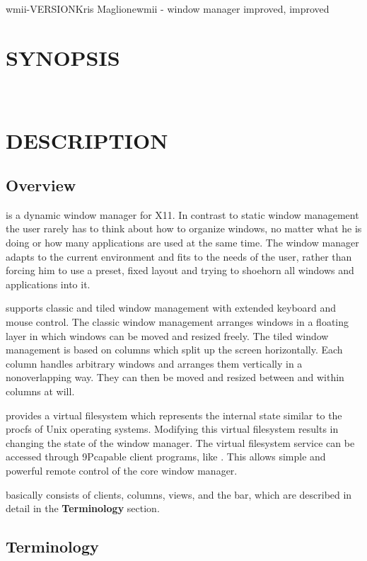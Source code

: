 \begin{Name}{1}{wmii-VERSION}{Kris Maglione}{}{wmii - window manager improved, improved}
\section{SYNOPSIS}
   \\
 

\section{DESCRIPTION}

\subsection{Overview}

 is a dynamic window manager for X11. In contrast to
static window management the user rarely has to think about how to
organize windows, no matter what he is doing or how many
applications are used at the same time.  The window manager adapts
to the current environment and fits to the needs of the user, rather
than forcing him to use a preset, fixed layout and trying to
shoehorn all windows and applications into it.

 supports classic and tiled window management with
extended keyboard and mouse control. The classic window management
arranges windows in a floating layer in which windows can be moved
and resized freely. The tiled window management is based on columns
which split up the screen horizontally. Each column handles
arbitrary windows and arranges them vertically in a non\-overlapping
way. They can then be moved and resized between and within columns
at will.

 provides a virtual filesystem which represents the
internal state similar to the procfs of Unix operating systems.
Modifying this virtual filesystem results in changing the state of
the window manager. The virtual filesystem service can be accessed
through 9P\-capable client programs, like .  This
allows simple and powerful remote control of the core window
manager.

 basically consists of clients, columns, views, and the
bar, which are described in detail in the \textbf{Terminology}
section.

\subsection{Terminology}


\end{Name}
